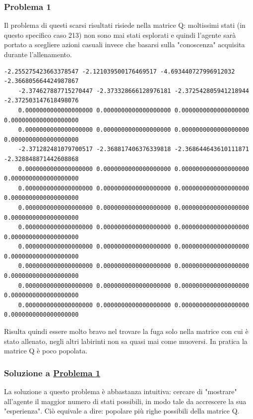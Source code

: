 \subsubsection{Problema 1}
\label{sec:problema11}

Il problema di questi scarsi risultati risiede nella matrice Q: moltissimi stati (in questo specifico caso 213) non sono mai stati esplorati e quindi l'agente sar\`{a} portato a scegliere azioni casuali invece che basarsi sulla "conoscenza" acquisita durante l'allenamento.\\

\begin{lstlisting}[style=python, basicstyle=\tiny, caption={Alcune righe della matrice Q}]
	-2.255275423663378547 -2.121039500176469517 -4.693440727996912032 -2.366805664424987867
	-2.374627887715270447 -2.373328666128976181 -2.372542805941218944 -2.372503147618498076
	0.0000000000000000000 0.0000000000000000000 0.0000000000000000000 0.0000000000000000000
	0.0000000000000000000 0.0000000000000000000 0.0000000000000000000 0.0000000000000000000
	-2.371282481079700517 -2.368817406376339818 -2.368644643610111871 -2.328848871442608868
	0.0000000000000000000 0.0000000000000000000 0.0000000000000000000 0.0000000000000000000
	0.0000000000000000000 0.0000000000000000000 0.0000000000000000000 0.0000000000000000000
	0.0000000000000000000 0.0000000000000000000 0.0000000000000000000 0.0000000000000000000
	0.0000000000000000000 0.0000000000000000000 0.0000000000000000000 0.0000000000000000000
	0.0000000000000000000 0.0000000000000000000 0.0000000000000000000 0.0000000000000000000
	0.0000000000000000000 0.0000000000000000000 0.0000000000000000000 0.0000000000000000000
	0.0000000000000000000 0.0000000000000000000 0.0000000000000000000 0.0000000000000000000
	0.0000000000000000000 0.0000000000000000000 0.0000000000000000000 0.0000000000000000000
\end{lstlisting}

Risulta quindi essere molto bravo nel trovare la fuga solo nella matrice con cui \`{e} stato allenato, negli altri labirinti non sa quasi mai come muoversi. In pratica la matrice Q \`{e} poco popolata.

\subsubsection{Soluzione a \hyperref[sec:problema11]{Problema 1}}
\label{sec:solprob11}

La soluzione a questo problema \`{e} abbastanza intuitiva: cercare di "mostrare" all'agente il maggior numero di stati possibili, in modo tale da accrescere la sua "esperienza". Ci\`{o} equivale a dire: popolare pi\`{u} righe possibili della matrice Q.\\

